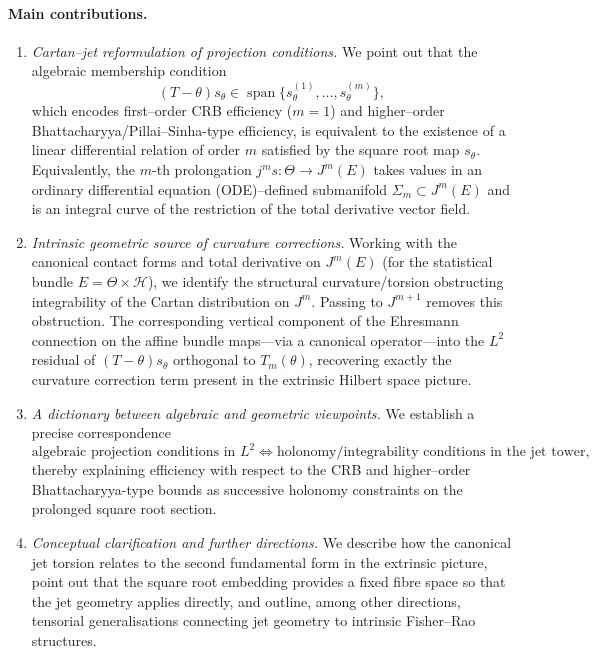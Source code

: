 \documentclass[3p,times]{elsarticle}
\begin{document}
\paragraph{Main contributions.}
\begin{enumerate}
  \item \emph{Cartan--jet reformulation of projection conditions.}  
  We point out that the algebraic membership condition
  \[
    (T-\theta)s_\theta \in \operatorname{span}\{s_\theta^{(1)},\dots,s_\theta^{(m)}\},
  \]
  which encodes first--order CRB efficiency ($m=1$) and higher--order
  Bhattacharyya/Pillai--Sinha-type efficiency, is equivalent to the existence of a
  linear differential relation of order $m$ satisfied by the square root map
  $s_\theta$.  
  Equivalently, the $m$-th prolongation $j^m s:\Theta\to J^m(E)$ takes values in 
  an ordinary differential equation (ODE)--defined submanifold $\Sigma_m\subset J^m(E)$ and is an integral curve
  of the restriction of the total derivative vector field.

  \item \emph{Intrinsic geometric source of curvature corrections.}  
  Working with the canonical contact forms and total derivative on $J^m(E)$ (for
  the statistical bundle $E=\Theta\times \mathcal{H}$), we identify the structural
  curvature/torsion obstructing integrability of the Cartan distribution on
  $J^{m}$.  
  Passing to $J^{m+1}$ removes this obstruction.  
  The corresponding vertical component of the Ehresmann connection on
  the affine bundle maps—via a canonical operator—into the
  $L^2$ residual of $(T-\theta)s_\theta$ orthogonal to $T_m(\theta)$, recovering
  exactly the curvature correction term present in the extrinsic Hilbert space
  picture.

  \item \emph{A dictionary between algebraic and geometric viewpoints.}  
  We establish a precise correspondence  \small
  \[
    \text{algebraic projection conditions in $L^2$}
    \Longleftrightarrow
    \text{holonomy/integrability conditions in the jet tower},
  \]\normalsize
  thereby explaining efficiency with respect to the CRB and higher--order Bhattacharyya-type bounds as
  successive holonomy constraints on the prolonged square root section.
  
  \item \emph{Conceptual clarification and further directions.}  
  We describe how the canonical jet torsion relates to the
  second fundamental form in the extrinsic picture, point out that the square root embedding provides a fixed fibre space so that the jet geometry applies
directly, and outline, among other directions, tensorial generalisations connecting jet geometry to intrinsic Fisher–Rao structures.
\end{enumerate}
\end{document}
